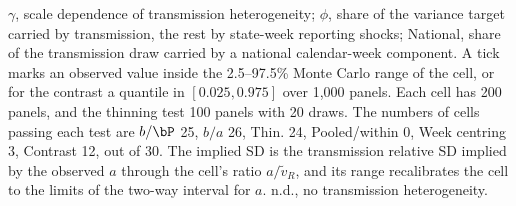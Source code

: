 \begin{table}[!tbp]
\begin{minipage}{\linewidth}\footnotesize\raggedright $\gamma$, scale dependence of transmission heterogeneity; $\phi$, share of the variance target carried by transmission, the rest by state-week reporting shocks; National, share of the transmission draw carried by a national calendar-week component. A tick marks an observed value inside the 2.5--97.5\% Monte Carlo range of the cell, or for the contrast a quantile in $[0.025,0.975]$ over 1,000 panels. Each cell has 200 panels, and the thinning test 100 panels with 20 draws. The numbers of cells passing each test are $b/\bP$ 25, $b/a$ 26, Thin. 24, Pooled/within 0, Week centring 3, Contrast 12, out of 30. The implied SD is the transmission relative SD implied by the observed $a$ through the cell's ratio $a/\tilde v_R$, and its range recalibrates the cell to the limits of the two-way interval for $a$. n.d., no transmission heterogeneity.\end{minipage}
\end{table}

